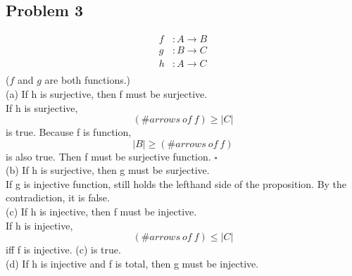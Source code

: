 \documentclass{article}
\begin{document}
\subsection*{Problem 3}
\begin{align*}
    f &: A \rightarrow B\\
    g &: B \rightarrow C\\
    h &: A \rightarrow C\\
\end{align*}
($f$ and $g$ are both functions.)\\
\smallskip
(a) If h is surjective, then f must be surjective.\\
If h is surjective,
\begin{equation}
    (\#arrows\ of\ f) \ge |C|
\end{equation}
is true. Because f is function,
\begin{equation}
    |B| \ge (\#arrows\ of\ f)
\end{equation}
is also true. Then f must be surjective function. $\square$\\ 
(b) If h is surjective, then g must be surjective.\\
If g is injective function, still holds the lefthand side of the proposition. By the contradiction, it is false.\\
(c) If h is injective, then f must be injective.\\
If h is injective,\\
\begin{equation}
    (\#arrows\ of \ f) \le |C|
\end{equation}
iff f is injective. (c) is true.\\
(d) If h is injective and f is total, then g must be injective.\\
\end{document}
